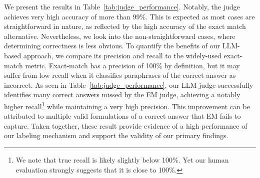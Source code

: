 We present the results in Table~\ref{tab:judge_performance}. Notably, the judge achieves very high accuracy of more  than 99\%. This is expected as most cases are  straightforward in nature, as reflected by the high accuracy of the exact match alternative. 
Nevertheless, we look into the non-straightforward cases, where determining correctness is less obvious. To quantify the benefits of our LLM-based approach, we compare its precision and recall to the widely-used exact-match metric. 
Exact-match has a precision of 100\% by definition, but it may suffer from low recall when it classifies paraphrases of the correct answer as incorrect.
As seen in Table~\ref{tab:judge_performance}, our LLM judge successfully identifies many correct answers missed by the EM judge,
achieving a notably higher recall\footnote{We note that true recall is likely slightly below 100\%. Yet our human evaluation strongly suggests that it is close to 100\%.} while maintaining a very high precision. 
This improvement can be attributed to multiple valid formulations of a correct answer that EM fails to capture.
Taken together, these result provide evidence of a high performance of our labeling mechanism and support the validity of our primary findings.


\renewcommand{\arraystretch}{1.2} %


\begin{figure}[ht]
    \centering
    \setlength{\tabcolsep}{7.1pt} %
    \label{tab:knowledge-errors} %
\end{figure}

